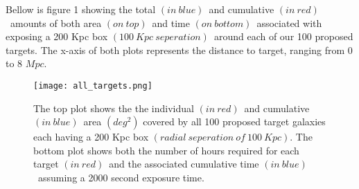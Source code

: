 \documentclass[11pt,a4paper,fleqn,notitlepage,oneside]{article}
\begin{document}
			Bellow is figure 1 showing the total $(in\ blue)$\ and cumulative $(in\ red)$\ amounts of both area $(on\ top)$\ and time $(on\ bottom)$\ associated with exposing a 200 Kpc box $(100\ Kpc\ seperation)$\ around each of our 100 proposed targets.
			The x-axis of both plots represents the distance to target, ranging from 0 to 8 $Mpc$.
			\begin{figure}[H]\centering
				\label{fig:all_targets}
				\texttt{[image: all\_targets.png]}
				\caption{
					The top plot shows the the individual $(in\ red)$\ and cumulative $(in\ blue)$\ area $(deg^{2})$ covered by all 100 proposed target galaxies each having a 200 Kpc box $(radial\ seperation\ of\ 100\ Kpc)$.
					The bottom plot shows both the number of hours required for each target $(in\ red)$\ and the associated cumulative time $(in\ blue)$\ assuming a 2000 second exposure time.
				}
			\end{figure}	


	{}
	

\end{document}
